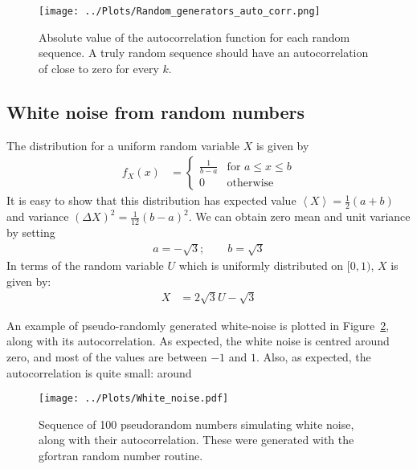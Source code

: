 \documentclass[twocolumn]{myarticle}
\begin{document}
\begin{figure}[ht!]
    \begin{center}
    \texttt{[image: ../Plots/Random\_generators\_auto\_corr.png]}
    \caption{%
        Absolute value of the autocorrelation function for each random sequence.
        A truly random sequence should have an autocorrelation of close to zero for every $ k $.
    }
    \label{fig:random_generators_auto_corr}
    \end{center}
\end{figure}

\subsection{White noise from random numbers}
\label{subsec:white_noise_from_random_numbers}

The distribution for a uniform random variable $ X $ is given by
\begin{align}
    f_X(x) &= \begin{cases} \frac{1}{b-a} & \text{for } a \leq x \leq b \\ 0 & \text{otherwise} \end{cases}
\end{align}
It is easy to show that this distribution has expected value $ \left\langle X \right\rangle = \frac{1}{2} (a+b) $ and variance $ (\Delta X)^2 = \frac{1}{12} (b-a)^2 $.
We can obtain zero mean and unit variance by setting
\begin{align}
    a = -\sqrt{3} ; \qquad b = \sqrt{3}
\end{align}
In terms of the random variable $ U $ which is uniformly distributed on $ [0, 1) $, $ X $ is given by:
\begin{align}
    X &= 2 \sqrt{3} U - \sqrt{3}
\end{align}

An example of pseudo-randomly generated white-noise is plotted in Figure~\ref{fig:white_noise}, along with its autocorrelation.
As expected, the white noise is centred around zero, and most of the values are between $ -1 $ and $ 1 $.
Also, as expected, the autocorrelation is quite small: around 

\begin{figure}[ht!]
    \begin{center}
    \texttt{[image: ../Plots/White\_noise.pdf]}
    \caption{%
        Sequence of 100 pseudorandom numbers simulating white noise, along with their autocorrelation.
        These were generated with the gfortran random number routine.
    }
    \label{fig:white_noise}
    \end{center}
\end{figure}
\end{document}
